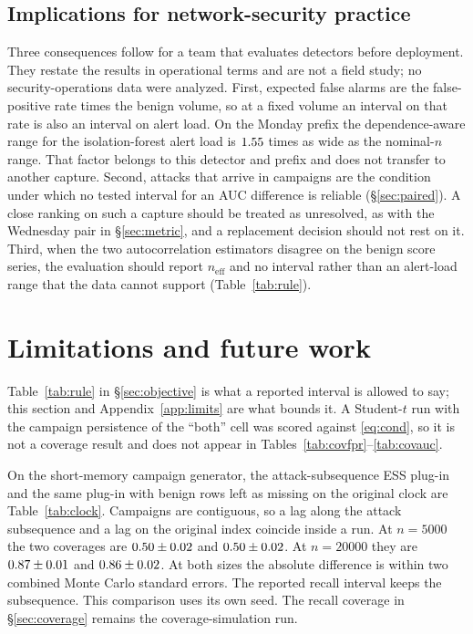 \documentclass[a4paper,fleqn]{cas-dc}
\newcommand{\neff}{n_{\mathrm{eff}}}
\newcommand{\tabwidth}{\columnwidth}
\newcommand{\tabbody}{\small\setlength{\tabcolsep}{3.5pt}\renewcommand{\arraystretch}{1.08}}
\newcommand{\onetab}{\renewcommand{\tabwidth}{\columnwidth}\tabbody}
\begin{document}
\subsection{Implications for network-security practice}\label{sec:practice}
Three consequences follow for a team that evaluates detectors before deployment. They restate the
results in operational terms and are not a field study; no security-operations data were analyzed.
First, expected false alarms are the false-positive rate times the benign volume, so at a fixed
volume an interval on that rate is also an interval on alert load. On the Monday prefix the
dependence-aware range for the isolation-forest alert load is $1.55$ times as wide as the
nominal-$n$ range. That factor belongs to this detector and prefix and does not transfer to another
capture. Second, attacks that arrive in campaigns are the condition under which no tested interval
for an AUC difference is reliable (\S\ref{sec:paired}). A close ranking on such a capture should be
treated as unresolved, as with the Wednesday pair in \S\ref{sec:metric}, and a replacement decision
should not rest on it. Third, when the two autocorrelation estimators disagree on the benign score
series, the evaluation should report $\neff$ and no interval rather than an alert-load range that
the data cannot support (Table~\ref{tab:rule}).

\FloatBarrier
\section{Limitations and future work}\label{sec:limitations}
Table~\ref{tab:rule} in \S\ref{sec:objective} is what a reported interval is allowed to say; this section and Appendix~\ref{app:limits} are what bounds it.
A Student-$t$ run with the campaign persistence of the ``both'' cell was scored against \eqref{eq:cond}, so it is not a coverage result and does not appear in Tables~\ref{tab:covfpr}--\ref{tab:covauc}.

On the short-memory campaign generator, the attack-subsequence ESS plug-in and the same plug-in with benign rows left as missing on the original clock are Table~\ref{tab:clock}.
Campaigns are contiguous, so a lag along the attack subsequence and a lag on the original index coincide inside a run.
At $n{=}5000$ the two coverages are $0.50\pm0.02$ and $0.50\pm0.02$. At $n{=}20000$ they are $0.87\pm0.01$ and $0.86\pm0.02$.
At both sizes the absolute difference is within two combined Monte Carlo standard errors.
The reported recall interval keeps the subsequence. This comparison uses its own seed. The recall coverage in \S\ref{sec:coverage} remains the coverage-simulation run.
\begin{table}[ht]
\centering
\caption{Recall coverage of two clocks on the same replicates. Short-memory campaign generator, threshold-conditional target, $R{=}500$. Cell format matches Tables~\ref{tab:covfpr}--\ref{tab:covauc}: unconditional coverage, and, when the computable fraction is below 0.995, conditional coverage and that fraction. From \texttt{results/recall\_clock.csv}.}\label{tab:clock}
\onetab

\end{table}
\end{document}
